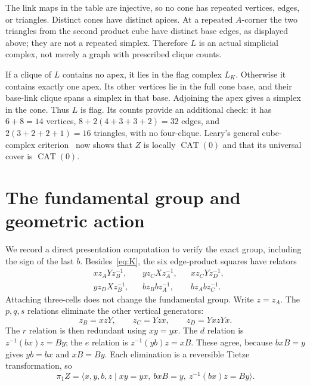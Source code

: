 \documentclass[11pt]{article}
\newcommand{\CAT}{\operatorname{CAT}}
\begin{document}
The link maps in the table are injective, so no cone has repeated vertices,
edges, or triangles. Distinct cones have distinct apices. At a repeated
$A$-corner the two triangles from the second product cube have distinct
base edges, as displayed above; they are not a repeated simplex. Therefore
$L$ is an actual simplicial complex, not merely a graph with prescribed
clique counts.

If a clique of $L$ contains no apex, it lies in the flag complex $L_K$.
Otherwise it contains exactly one apex. Its other vertices lie in the
full cone base, and their base-link clique spans a simplex in that base.
Adjoining the apex gives a simplex in the cone. Thus $L$ is flag. Its
counts provide an additional check: it has $6+8=14$ vertices,
$8+2(4+3+3+2)=32$ edges, and $2(3+2+2+1)=16$ triangles, with no
four-clique. Leary's general cube-complex criterion~\cite[Theorem~C.9,
p.~33]{Leary} now shows that $Z$ is locally $\CAT(0)$ and that its
universal cover is $\CAT(0)$.

\section{The fundamental group and geometric action}

We record a direct presentation computation to verify the exact group,
including the sign of the last $b$. Besides~\eqref{eq:K}, the six
edge-product squares have relators
\begin{equation}\label{eq:squares}
\begin{aligned}
 &xz_A Yz_B^{-1}, &&yz_C Xz_A^{-1}, &&xz_C Yz_D^{-1},\\
 &yz_D Xz_B^{-1}, &&bz_Bbz_A^{-1}, &&bz_Abz_C^{-1}.
\end{aligned}
\end{equation}
Attaching three-cells does not change the fundamental group. Write
$z=z_A$. The $p,q,s$ relations eliminate the other vertical generators:
\begin{equation}\label{eq:eliminate}
 z_B=xzY,\qquad z_C=Yzx,\qquad z_D=YxzYx.
\end{equation}
The $r$ relation is then redundant using $xy=yx$. The $d$ relation is
$z^{-1}(bx)z=By$; the $e$ relation is $z^{-1}(yb)z=xB$. These agree,
because $bxB=y$ gives $yb=bx$ and $xB=By$. Each elimination is a
reversible Tietze transformation, so
\begin{equation}\label{eq:HNN}
 \pi_1Z=\langle x,y,b,z\mid xy=yx,\ bxB=y,\ z^{-1}(bx)z=By\rangle.
\end{equation}
\end{document}
